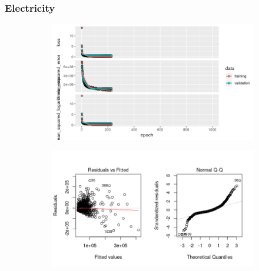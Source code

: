 \subsubsection{Electricity}
\label{appendix:electricity:nn_full}
\begin{figure}[h]
\begin{subfigure}{1\textwidth}
\centering
\includegraphics[width=.99\textwidth, height=0.3\textheight]{Images/electricity_nn_full_train_results.png}
\end{subfigure}
\begin{subfigure}{1\textwidth}
\centering
\includegraphics[width=.99\textwidth, height=0.3\textheight]{Images/electricity_nn_full_resid_1.png}
\end{subfigure}
\end{figure}